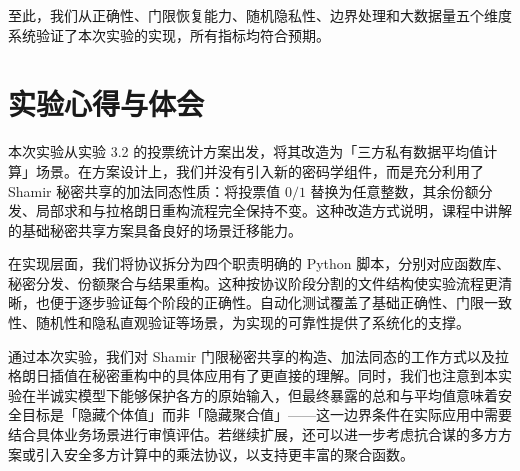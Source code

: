 \documentclass[UTF8,a4paper,10pt]{ctexart}
\begin{document}
至此，我们从正确性、门限恢复能力、随机隐私性、边界处理和大数据量五个维度系统验证了本次实验的实现，所有指标均符合预期。

\section{实验心得与体会}

本次实验从实验 3.2 的投票统计方案出发，将其改造为「三方私有数据平均值计算」场景。在方案设计上，我们并没有引入新的密码学组件，而是充分利用了 Shamir 秘密共享的加法同态性质：将投票值 $0/1$ 替换为任意整数，其余份额分发、局部求和与拉格朗日重构流程完全保持不变。这种改造方式说明，课程中讲解的基础秘密共享方案具备良好的场景迁移能力。

在实现层面，我们将协议拆分为四个职责明确的 Python 脚本，分别对应函数库、秘密分发、份额聚合与结果重构。这种按协议阶段分割的文件结构使实验流程更清晰，也便于逐步验证每个阶段的正确性。自动化测试覆盖了基础正确性、门限一致性、随机性和隐私直观验证等场景，为实现的可靠性提供了系统化的支撑。

通过本次实验，我们对 Shamir 门限秘密共享的构造、加法同态的工作方式以及拉格朗日插值在秘密重构中的具体应用有了更直接的理解。同时，我们也注意到本实验在半诚实模型下能够保护各方的原始输入，但最终暴露的总和与平均值意味着安全目标是「隐藏个体值」而非「隐藏聚合值」——这一边界条件在实际应用中需要结合具体业务场景进行审慎评估。若继续扩展，还可以进一步考虑抗合谋的多方方案或引入安全多方计算中的乘法协议，以支持更丰富的聚合函数。
\end{document}
